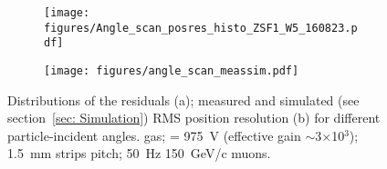 \begin{figure}[h]
\begin{subfigure}[t]{0.5\textwidth}\caption{}
\texttt{[image: figures/Angle\_scan\_posres\_histo\_ZSF1\_W5\_160823.pdf]}
\end{subfigure}
\begin{subfigure}[t]{0.5\textwidth}\caption{}
\texttt{[image: figures/angle\_scan\_meassim.pdf]}
\end{subfigure}
\caption{Distributions of the residuals (a); measured and simulated (see section~\ref{sec: Simulation}) RMS position resolution (b) for different particle-incident angles. \nech gas; \dvrpwell= 975~V (effective gain $\sim$3$\times$10$^3$); 1.5~mm strips pitch; 50~Hz 150~GeV/c muons.}\label{fig: angle scan}
\end{figure}

